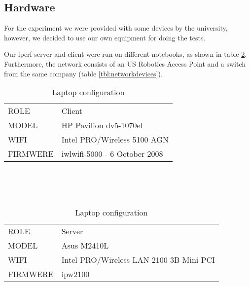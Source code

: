 \subsection{Hardware} \label{setup:hardware}

For the experiment we were provided with some devices by the university, however, we decided to use our own equipment for doing the tests.

Our iperf server and client were run on different notebooks, as shown in table \ref{tbl:laptops}. Furthermore, the network consists of an US Robotics Access Point and a switch from the same company (table \ref{tbl:networkdevices}).


	\begin{table}[h]
		
		\begin{tabularx}{15cm}{ | m{4cm} X | }
			\hline
				ROLE & Client\\
				MODEL & HP Pavilion dv5-1070el\\
				WIFI & Intel PRO/Wireless 5100 AGN\\
				FIRMWERE & iwlwifi-5000 - 6 October 2008\\
			\hline
		\end{tabularx}
		\\\\\\
		\begin{tabularx}{15cm}{ | m{4cm} X | }
			\hline
				ROLE & Server\\
				MODEL & Asus M2410L\\
				WIFI & Intel PRO/Wireless LAN 2100 3B Mini PCI\\
				FIRMWERE & ipw2100\\
			\hline
		\end{tabularx}
		
		\caption{Laptop configuration}
		\label{table1}
		\label{tbl:laptops}
	\end{table}

